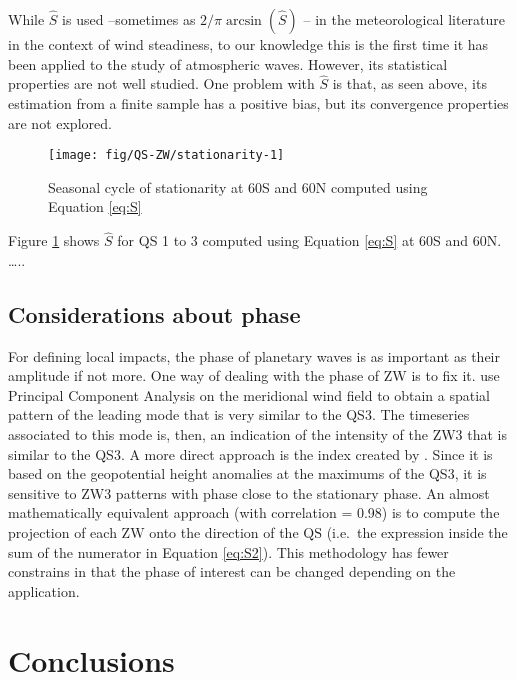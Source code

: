 \documentclass[draft,linenumbers]{agujournal2018}
\begin{document}
While \(\hat{S}\) is used --sometimes as
\(2/\pi\arcsin \left (\hat{S} \right )\) \citep{Singer1967}-- in the
meteorological literature in the context of wind steadiness, to our
knowledge this is the first time it has been applied to the study of
atmospheric waves. However, its statistical properties are not well
studied. One problem with \(\hat{S}\) is that, as seen above, its
estimation from a finite sample has a positive bias, but its convergence
properties are not explored.

\begin{figure}[h]

{\centering \texttt{[image: fig/QS-ZW/stationarity-1]} 

}

\caption{Seasonal cycle of stationarity at 60\degree S and 60\degree N computed using Equation \ref{eq:S}}\label{fig:stationarity}
\end{figure}

Figure \ref{fig:stationarity} shows \(\hat{S}\) for QS 1 to 3 computed
using Equation \ref{eq:S} at 60\degree S and 60\degree N. \ldots{}..

\subsection{Considerations about phase}

\label{sec:phase}

For defining local impacts, the phase of planetary waves is as important
as their amplitude if not more. One way of dealing with the phase of ZW
is to fix it. \citet{Yuan2008} use Principal Component Analysis on the
meridional wind field to obtain a spatial pattern of the leading mode
that is very similar to the QS3. The timeseries associated to this mode
is, then, an indication of the intensity of the ZW3 that is similar to
the QS3. A more direct approach is the index created by
\citet{Raphael2004}. Since it is based on the geopotential height
anomalies at the maximums of the QS3, it is sensitive to ZW3 patterns
with phase close to the stationary phase. An almost mathematically
equivalent approach (with correlation = 0.98) is to compute the
projection of each \(\mathrm{ZW}\) onto the direction of the
\(\mathrm{QS}\) (i.e.~the expression inside the sum of the numerator in
Equation \ref{eq:S2}). This methodology has fewer constrains in that the
phase of interest can be changed depending on the application.

\section{Conclusions}
\end{document}
